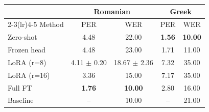 \begin{tabular}{lcccc}
\toprule
 & \multicolumn{2}{c}{Romanian} & \multicolumn{2}{c}{Greek} \\
\cmidrule(lr){2-3}\cmidrule(lr){4-5}
Method & PER & WER & PER & WER \\
\midrule
Zero-shot & 4.48 & 22.00 & \textbf{1.56} & \textbf{10.00} \\
Frozen head & 4.48 & 23.00 & 1.71 & 11.00 \\
LoRA (r=8) & 4.11 $\pm$ 0.20 & 18.67 $\pm$ 2.36 & 7.32 & 35.00 \\
LoRA (r=16) & 3.36 & 15.00 & 7.17 & 35.00 \\
Full FT & \textbf{1.76} & \textbf{10.00} & 2.80 & 16.00 \\
\midrule
Baseline & -- & 10.00 & -- & 21.00 \\
\bottomrule
\end{tabular}
